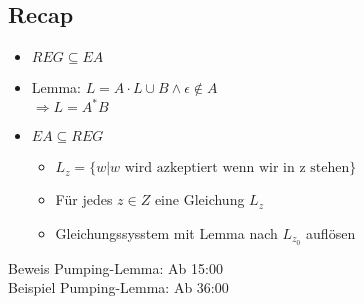 \documentclass{article}
\begin{document}
\subsection*{Recap}
\begin{itemize}
    \item $REG \subseteq EA$
    \item Lemma: $L = A \cdot L \cup B \land \epsilon \notin A$ \\
        $\Rightarrow L = A^* B$
    \item $EA \subseteq REG$ 
    \begin{itemize}
        \item $L_z = \{ w | w \text{ wird azkeptiert wenn wir in z stehen}\}$
        \item Für jedes $z \in Z$ eine Gleichung $L_z$
        \item Gleichungssysstem mit Lemma nach $L_{z_0}$ auflösen
    \end{itemize}
\end{itemize}
Beweis Pumping-Lemma: Ab 15:00 \\
Beispiel Pumping-Lemma: Ab 36:00 \\
\end{document}
